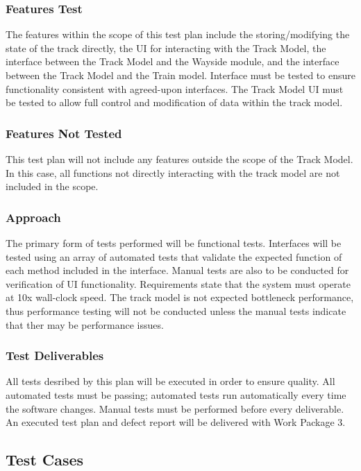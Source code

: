 \documentclass{scrreprt}
\begin{document}
\subsubsection{Features Test}
The features within the scope of this test plan include the storing/modifying the state of the track directly, the UI for interacting with the Track Model, the interface between the Track Model and the Wayside module, and the interface between the Track Model and the Train model. Interface must be tested to ensure functionality consistent with agreed-upon interfaces. The Track Model UI must be tested to allow full control and modification of data within the track model.

\subsubsection{Features Not Tested}
This test plan will not include any features outside the scope of the Track Model. In this case, all functions not directly interacting with the track model are not included in the scope.

\subsubsection{Approach}
The primary form of tests performed will be functional tests. Interfaces will be tested using an array of automated tests that validate the expected function of each method included in the interface. Manual tests are also to be conducted for verification of UI functionality. Requirements state that the system must operate at 10x wall-clock speed. The track model is not expected bottleneck performance, thus performance testing will not be conducted unless the manual tests indicate that ther may be performance issues.

\subsubsection{Test Deliverables}
All tests desribed by this plan will be executed in order to ensure quality. All automated tests must be passing; automated tests run automatically every time the software changes. Manual tests must be performed before every deliverable. An executed test plan and defect report will be delivered with Work Package 3.

\subsection{Test Cases}
\end{document}
